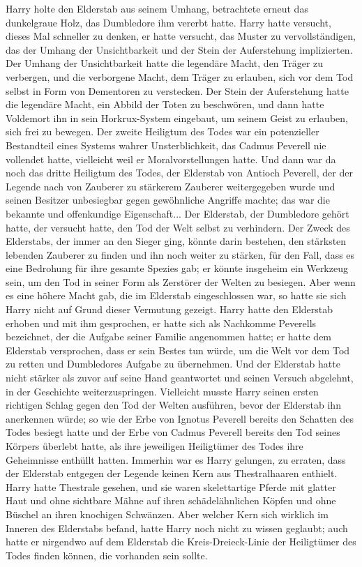 Harry holte den Elderstab aus seinem Umhang, betrachtete erneut das dunkelgraue
Holz, das Dumbledore ihm vererbt hatte. Harry hatte versucht, dieses Mal
schneller zu denken, er hatte versucht, das Muster zu vervollständigen, das der
Umhang der Unsichtbarkeit und der Stein der Auferstehung implizierten. Der
Umhang der Unsichtbarkeit hatte die legendäre Macht, den Träger zu verbergen,
und die verborgene Macht, dem Träger zu erlauben, sich vor dem Tod selbst in
Form von Dementoren zu verstecken. Der Stein der Auferstehung hatte die
legendäre Macht, ein Abbild der Toten zu beschwören, und dann hatte Voldemort
ihn in sein Horkrux-System eingebaut, um seinem Geist zu erlauben, sich frei zu
bewegen. Der zweite Heiligtum des Todes war ein potenzieller Bestandteil eines
Systems wahrer Unsterblichkeit, das Cadmus Peverell nie vollendet hatte,
vielleicht weil er Moralvorstellungen hatte. Und dann war da noch das dritte
Heiligtum des Todes, der Elderstab von Antioch Peverell, der der Legende nach
von Zauberer zu stärkerem Zauberer weitergegeben wurde und seinen Besitzer
unbesiegbar gegen gewöhnliche Angriffe machte; das war die bekannte und
offenkundige Eigenschaft... Der Elderstab, der Dumbledore gehört hatte, der
versucht hatte, den Tod der Welt selbst zu verhindern. Der Zweck des Elderstabs,
der immer an den Sieger ging, könnte darin bestehen, den stärksten lebenden
Zauberer zu finden und ihn noch weiter zu stärken, für den Fall, dass es eine
Bedrohung für ihre gesamte Spezies gab; er könnte insgeheim ein Werkzeug sein,
um den Tod in seiner Form als Zerstörer der Welten zu besiegen. Aber wenn es
eine höhere Macht gab, die im Elderstab eingeschlossen war, so hatte sie sich
Harry nicht auf Grund dieser Vermutung gezeigt. Harry hatte den Elderstab
erhoben und mit ihm gesprochen, er hatte sich als Nachkomme Peverells
bezeichnet, der die Aufgabe seiner Familie angenommen hatte; er hatte dem
Elderstab versprochen, dass er sein Bestes tun würde, um die Welt vor dem Tod zu
retten und Dumbledores Aufgabe zu übernehmen. Und der Elderstab hatte nicht
stärker als zuvor auf seine Hand geantwortet und seinen Versuch abgelehnt, in
der Geschichte weiterzuspringen. Vielleicht musste Harry seinen ersten richtigen
Schlag gegen den Tod der Welten ausführen, bevor der Elderstab ihn anerkennen
würde; so wie der Erbe von Ignotus Peverell bereits den Schatten des Todes
besiegt hatte und der Erbe von Cadmus Peverell bereits den Tod seines Körpers
überlebt hatte, als ihre jeweiligen Heiligtümer des Todes ihre Geheimnisse
enthüllt hatten. Immerhin war es Harry gelungen, zu erraten, dass der Elderstab
entgegen der Legende keinen Kern aus \glqq Thestralhaaren\grqq{} enthielt. Harry
hatte Thestrale gesehen, und sie waren skelettartige Pferde mit glatter Haut und
ohne sichtbare Mähne auf ihren schädelähnlichen Köpfen und ohne Büschel an ihren
knochigen Schwänzen. Aber welcher Kern sich wirklich im Inneren des Elderstabs
befand, hatte Harry noch nicht zu wissen geglaubt; auch hatte er nirgendwo auf
dem Elderstab die Kreis-Dreieck-Linie der Heiligtümer des Todes finden können,
die vorhanden sein sollte.

